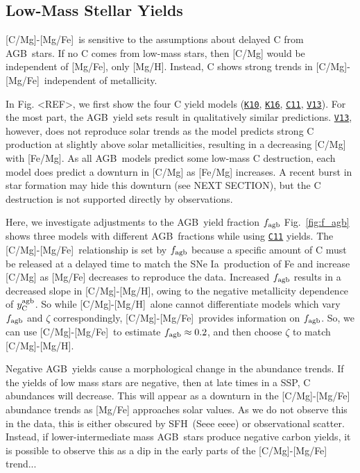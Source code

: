 \documentclass[fleqn,usenatbib]{mnras}
\newcommand{\cxi}{\texttt{\hyperlink{C11}{C11}}}
\newcommand{\kx}{\texttt{\hyperlink{K10}{K10}}}
\newcommand{\kxvi}{\texttt{\hyperlink{K16}{K16}}}
\newcommand{\vxiii}{\texttt{\hyperlink{V13}{V13}}}
\newcommand{\agb}{AGB}
\newcommand{\ia}{SNe Ia}
\newcommand{\sfh}{SFH} %
\newcommand{\caah}{[C/Mg]-[Mg/H]}
\newcommand{\caafe}{[C/Mg]-[Mg/Fe]}
\newcommand{\Ycagb}{\ensuremath{y_{\rm C}^{\rm agb}}}
\begin{document}
\subsection{Low-Mass Stellar Yields}\label{sec:agb_results}

\caafe\ is sensitive to the assumptions about delayed C from \agb\ stars. If no C comes from low-mass stars, then [C/Mg] would be independent of [Mg/Fe], only [Mg/H]. Instead, C shows strong trends  in \caafe\, independent of metallicity. 

In Fig. <REF>, we first show the four C yield models (\kx, \kxvi, \cxi, \vxiii). For the most part, the \agb\ yield sets result in qualitatively similar predictions. \vxiii, however, does not reproduce solar trends as the model predicts strong C production at slightly above solar metallicities, resulting in a decreasing [C/Mg] with [Fe/Mg]. 
As all \agb\ models predict some low-mass C destruction, each model does predict a downturn in [C/Mg] as [Fe/Mg] increases. A recent burst in star formation may hide this downturn (see NEXT SECTION), but the C destruction is not supported directly by observations. 




Here, we investigate adjustments to the \agb\ yield fraction $f_{\rm agb}$
Fig.~\ref{fig:f_agb} shows three models with different \agb\ fractions while using \cxi{} yields.  The \caafe~relationship is set by $f_{\rm agb}$ because a specific amount of C must be released at a delayed time to match the \ia\ production of Fe and increase [C/Mg] as [Mg/Fe] decreases to reproduce the data.
Increased $f_{\rm agb}$ results in a decreased slope in \caah, owing to the negative metallicity dependence of $\Ycagb$. So while \caah~alone cannot differentiate models which vary $f_{\rm agb}$ and $\zeta$ correspondingly, \caafe~provides information on $f_{\rm agb}$. So, we can use \caafe~to estimate $f_{\rm agb}\approx 0.2$, and then choose $\zeta$ to match \caah.



Negative \agb\ yields cause a morphological change in the abundance trends. If the yields of low mass stars are negative, then at late times in a SSP, C abundances will decrease. This will appear as a downturn in the \caafe{} abundance trends as [Mg/Fe] approaches solar values. As we do not observe this in the data, this is either obscured by \sfh\ (Seee eeee) or observational scatter. 
Instead, if lower-intermediate mass \agb\ stars produce negative carbon yields, it is possible to observe this as a dip in the early parts of the \caafe{} trend...
\end{document}
